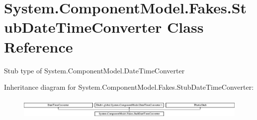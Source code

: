 \hypertarget{class_system_1_1_component_model_1_1_fakes_1_1_stub_date_time_converter}{\section{System.\-Component\-Model.\-Fakes.\-Stub\-Date\-Time\-Converter Class Reference}
\label{class_system_1_1_component_model_1_1_fakes_1_1_stub_date_time_converter}
}


Stub type of System.\-Component\-Model.\-Date\-Time\-Converter 


Inheritance diagram for System.\-Component\-Model.\-Fakes.\-Stub\-Date\-Time\-Converter\-:\begin{figure}[H]
\begin{center}
\leavevmode
\includegraphics[height=1.022831cm]{class_system_1_1_component_model_1_1_fakes_1_1_stub_date_time_converter}
\end{center}
\end{figure}
